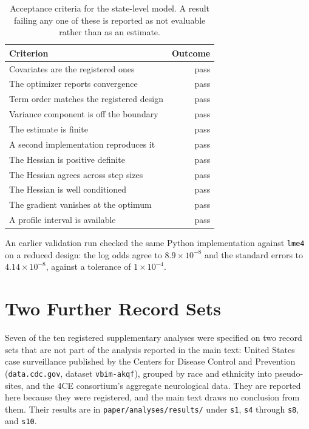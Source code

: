 \documentclass[11pt]{article}
\begin{document}
\begin{table}[h]
\centering
\caption{Acceptance criteria for the state-level model.  A result failing any
one of these is reported as not evaluable rather than as an estimate.}
\vspace{0.5\baselineskip}
\begin{tabular}{lr}
\toprule
Criterion & Outcome \\
\midrule
Covariates are the registered ones & pass \\
The optimizer reports convergence & pass \\
Term order matches the registered design & pass \\
Variance component is off the boundary & pass \\
The estimate is finite & pass \\
A second implementation reproduces it & pass \\
The Hessian is positive definite & pass \\
The Hessian agrees across step sizes & pass \\
The Hessian is well conditioned & pass \\
The gradient vanishes at the optimum & pass \\
A profile interval is available & pass \\
\bottomrule
\end{tabular}
\end{table}

An earlier validation run checked the same Python implementation against
\texttt{lme4} on a reduced design: the log odds agree to
$8.9 \times 10^{-8}$ and the standard
errors to $4.14 \times 10^{-8}$, against a
tolerance of $1 \times 10^{-4}$.

\section{Two Further Record Sets}
\label{supp:other}

Seven of the ten registered supplementary analyses were specified on two record
sets that are not part of the analysis reported in the main text: United States
case surveillance published by the Centers for Disease Control and Prevention
(\texttt{data.cdc.gov}, dataset \texttt{vbim-akqf}), grouped by race and
ethnicity into pseudo-sites, and the 4CE consortium's aggregate neurological
data.  They are reported here because they were registered, and the main text
draws no conclusion from them.  Their results are in
\texttt{paper/analyses/results/} under \texttt{s1}, \texttt{s4} through
\texttt{s8}, and \texttt{s10}.
\end{document}
